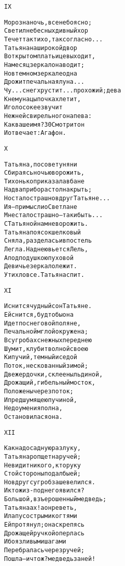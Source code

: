 \begin{minipage}[t]{\dimexpr 0.5\textwidth -\tabcolsep-.5pt}
\begin{alltt}\normalfont\centering
IX

Морозна ночь, все небо ясно;
Светил небесных дивный хор
Течет так тихо, так согласно...
Татьяна на широкой двор
В открытом платьице выходит,
На месяц зеркало наводит;
Но в темном зеркале одна
Дрожит печальная луна...
Чу... снег хрустит... прохожий; дева
К нему на цыпочках летит,
И голосок ее звучит
Нежней свирельного напева:
Как ваше имя? 30 Смотрит он
И отвечает: Агафон.
\end{alltt}
\end{minipage}

\begin{minipage}[t]{\dimexpr 0.5\textwidth -\tabcolsep-.5pt}
\begin{alltt}\normalfont\centering
X

Татьяна, по совету няни
Сбираясь ночью ворожить,
Тихонько приказала в бане
На два прибора стол накрыть;
Но стало страшно вдруг Татьяне...
И я — при мысли о Светлане
Мне стало страшно — так и быть...
С Татьяной нам не ворожить.
Татьяна поясок шелковый
Сняла, разделась и в постель
Легла. Над нею вьется Лель,
А под подушкою пуховой
Девичье зеркало лежит.
Утихло все. Татьяна спит.
\end{alltt}
\end{minipage}
\clearpage

\begin{minipage}[t]{\dimexpr 0.5\textwidth -\tabcolsep-.5pt}
\begin{alltt}\normalfont\centering
XI

И снится чудный сон Татьяне.
Ей снится, будто бы она
Идет по снеговой поляне,
Печальной мглой окружена;
В сугробах снежных перед нею
Шумит, клубит волной своею
Кипучий, темный и седой
Поток, не скованный зимой;
Две жердочки, склеены льдиной,
Дрожащий, гибельный мосток,
Положены через поток;
И пред шумящею пучиной,
Недоумения полна,
Остановилася она.
\end{alltt}
\end{minipage}

\begin{minipage}[t]{\dimexpr 0.5\textwidth -\tabcolsep-.5pt}
\begin{alltt}\normalfont\centering
XII

Как на досадную разлуку,
Татьяна ропщет на ручей;
Не видит никого, кто руку
С той стороны подал бы ей;
Но вдруг сугроб зашевелился.
И кто ж из-под него явился?
Большой, взъерошенный медведь;
Татьяна ах! а он реветь,
И лапу с острыми когтями
Ей протянул; она скрепясь
Дрожащей ручкой оперлась
И боязливыми шагами
Перебралась через ручей;
Пошла — и что ж? медведь за ней!
\end{alltt}
\end{minipage}
\clearpage

